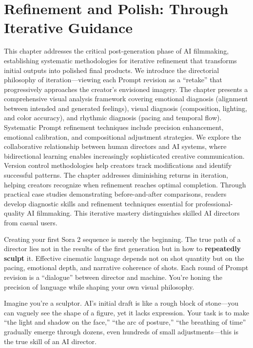 \chapter{Refinement and Polish: Through Iterative Guidance}
\label{ch:refinement-polish}

\begin{chapterabstract}
This chapter addresses the critical post-generation phase of AI filmmaking, establishing systematic methodologies for iterative refinement that transforms initial outputs into polished final products. We introduce the directorial philosophy of iteration—viewing each Prompt revision as a ``retake'' that progressively approaches the creator's envisioned imagery. The chapter presents a comprehensive visual analysis framework covering emotional diagnosis (alignment between intended and generated feelings), visual diagnosis (composition, lighting, and color accuracy), and rhythmic diagnosis (pacing and temporal flow). Systematic Prompt refinement techniques include precision enhancement, emotional calibration, and compositional adjustment strategies. We explore the collaborative relationship between human directors and AI systems, where bidirectional learning enables increasingly sophisticated creative communication. Version control methodologies help creators track modifications and identify successful patterns. The chapter addresses diminishing returns in iteration, helping creators recognize when refinement reaches optimal completion. Through practical case studies demonstrating before-and-after comparisons, readers develop diagnostic skills and refinement techniques essential for professional-quality AI filmmaking. This iterative mastery distinguishes skilled AI directors from casual users.
\end{chapterabstract}

Creating your first Sora 2 sequence is merely the beginning. The true path of a director lies not in the results of the first generation but in how to \textbf{repeatedly sculpt} it. Effective cinematic language depends not on shot quantity but on the pacing, emotional depth, and narrative coherence of shots. Each round of Prompt revision is a ``dialogue'' between director and machine. You're honing the precision of language while shaping your own visual philosophy.

Imagine you're a sculptor. AI's initial draft is like a rough block of stone—you can vaguely see the shape of a figure, yet it lacks expression. Your task is to make ``the light and shadow on the face,'' ``the arc of posture,'' ``the breathing of time'' gradually emerge through dozens, even hundreds of small adjustments—this is the true skill of an AI director.

